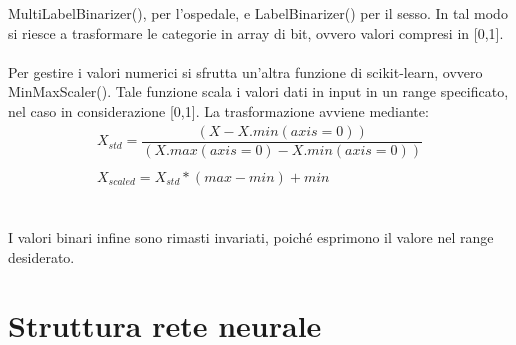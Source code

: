 MultiLabelBinarizer(), per l'ospedale, e LabelBinarizer() per il sesso. In tal modo si riesce a trasformare le categorie in array di 
bit, ovvero valori compresi in [0,1].
\\\\
Per gestire i valori numerici si sfrutta un'altra funzione di scikit-learn, ovvero MinMaxScaler().
Tale funzione scala i valori dati in input in un range specificato, nel caso in considerazione [0,1].
La trasformazione avviene mediante:
\begin{equation*}
    \begin{array}{l}
        X_{std} = \dfrac{(X - X.min(axis=0))}  {(X.max(axis=0) - X.min(axis=0))} \\\\
        X_{scaled} = X_{std} * (max - min) + min
    \end{array}
\end{equation*}
\\\\
I valori binari infine sono rimasti invariati, poiché esprimono il valore nel range desiderato.

\section{Struttura rete neurale}

